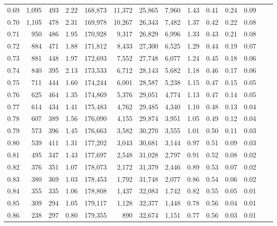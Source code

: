 \begin{tabular}{rrrrrrrrrrrrrr}
0.69 &  1,095 &  493 &    2.22 &  168,873 &   11,372 &  25,865 &   7,960 &  1.43 &  0.41 &  0.24 &      0.09 \\
0.70 &  1,105 &  478 &    2.31 &  169,978 &   10,267 &  26,343 &   7,482 &  1.37 &  0.42 &  0.22 &      0.08 \\
0.71 &    950 &  486 &    1.95 &  170,928 &    9,317 &  26,829 &   6,996 &  1.33 &  0.43 &  0.21 &      0.08 \\
0.72 &    884 &  471 &    1.88 &  171,812 &    8,433 &  27,300 &   6,525 &  1.29 &  0.44 &  0.19 &      0.07 \\
0.73 &    881 &  448 &    1.97 &  172,693 &    7,552 &  27,748 &   6,077 &  1.24 &  0.45 &  0.18 &      0.06 \\
0.74 &    840 &  395 &    2.13 &  173,533 &    6,712 &  28,143 &   5,682 &  1.18 &  0.46 &  0.17 &      0.06 \\
0.75 &    711 &  444 &    1.60 &  174,244 &    6,001 &  28,587 &   5,238 &  1.15 &  0.47 &  0.15 &      0.05 \\
0.76 &    625 &  464 &    1.35 &  174,869 &    5,376 &  29,051 &   4,774 &  1.13 &  0.47 &  0.14 &      0.05 \\
0.77 &    614 &  434 &    1.41 &  175,483 &    4,762 &  29,485 &   4,340 &  1.10 &  0.48 &  0.13 &      0.04 \\
0.78 &    607 &  389 &    1.56 &  176,090 &    4,155 &  29,874 &   3,951 &  1.05 &  0.49 &  0.12 &      0.04 \\
0.79 &    573 &  396 &    1.45 &  176,663 &    3,582 &  30,270 &   3,555 &  1.01 &  0.50 &  0.11 &      0.03 \\
0.80 &    539 &  411 &    1.31 &  177,202 &    3,043 &  30,681 &   3,144 &  0.97 &  0.51 &  0.09 &      0.03 \\
0.81 &    495 &  347 &    1.43 &  177,697 &    2,548 &  31,028 &   2,797 &  0.91 &  0.52 &  0.08 &      0.02 \\
0.82 &    376 &  351 &    1.07 &  178,073 &    2,172 &  31,379 &   2,446 &  0.89 &  0.53 &  0.07 &      0.02 \\
0.83 &    380 &  369 &    1.03 &  178,453 &    1,792 &  31,748 &   2,077 &  0.86 &  0.54 &  0.06 &      0.02 \\
0.84 &    355 &  335 &    1.06 &  178,808 &    1,437 &  32,083 &   1,742 &  0.82 &  0.55 &  0.05 &      0.01 \\
0.85 &    309 &  294 &    1.05 &  179,117 &    1,128 &  32,377 &   1,448 &  0.78 &  0.56 &  0.04 &      0.01 \\
0.86 &    238 &  297 &    0.80 &  179,355 &      890 &  32,674 &   1,151 &  0.77 &  0.56 &  0.03 &      0.01 \\

\end{tabular}
